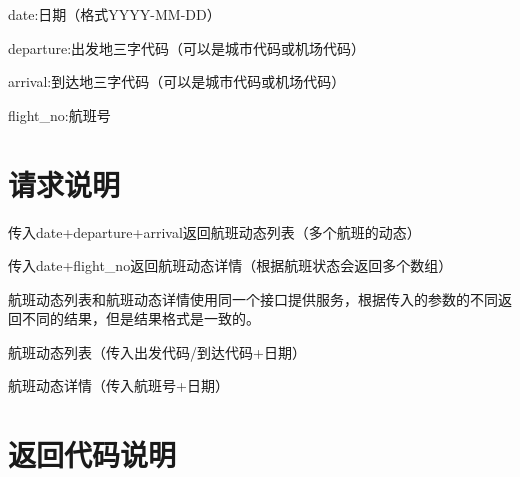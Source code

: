 \begin{compactitem}
\item date:日期（格式YYYY-MM-DD）
\item departure:出发地三字代码（可以是城市代码或机场代码）
\item arrival:到达地三字代码（可以是城市代码或机场代码）
\item flight\_no:航班号
\end{compactitem}

\section{请求说明}

\begin{compactenum}
\item 传入date+departure+arrival返回航班动态列表（多个航班的动态）
\item 传入date+flight\_no返回航班动态详情（根据航班状态会返回多个数组）
\end{compactenum}

航班动态列表和航班动态详情使用同一个接口提供服务，根据传入的参数的不同返回不同的结果，但是结果格式是一致的。

\begin{compactitem}
\item 航班动态列表（传入出发代码/到达代码+日期）
\item 航班动态详情（传入航班号+日期）
\end{compactitem}

\section{返回代码说明}




